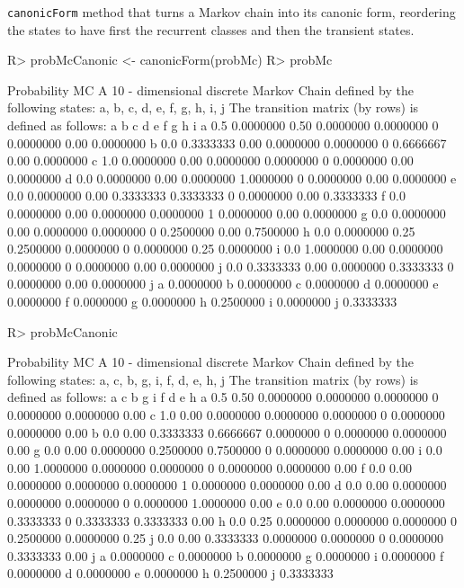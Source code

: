 \documentclass[
  nojss]{jss}
\begin{document}
\texttt{canonicForm} method that turns a Markov chain into its canonic form, reordering the states to have first the
recurrent classes and then the transient states.

\begin{CodeChunk}

\begin{CodeInput}
R> probMcCanonic <- canonicForm(probMc)
R> probMc
\end{CodeInput}

\begin{CodeOutput}
Probability MC 
 A  10 - dimensional discrete Markov Chain defined by the following states: 
 a, b, c, d, e, f, g, h, i, j 
 The transition matrix  (by rows)  is defined as follows: 
    a         b    c         d         e f         g    h         i
a 0.5 0.0000000 0.50 0.0000000 0.0000000 0 0.0000000 0.00 0.0000000
b 0.0 0.3333333 0.00 0.0000000 0.0000000 0 0.6666667 0.00 0.0000000
c 1.0 0.0000000 0.00 0.0000000 0.0000000 0 0.0000000 0.00 0.0000000
d 0.0 0.0000000 0.00 0.0000000 1.0000000 0 0.0000000 0.00 0.0000000
e 0.0 0.0000000 0.00 0.3333333 0.3333333 0 0.0000000 0.00 0.3333333
f 0.0 0.0000000 0.00 0.0000000 0.0000000 1 0.0000000 0.00 0.0000000
g 0.0 0.0000000 0.00 0.0000000 0.0000000 0 0.2500000 0.00 0.7500000
h 0.0 0.0000000 0.25 0.2500000 0.0000000 0 0.0000000 0.25 0.0000000
i 0.0 1.0000000 0.00 0.0000000 0.0000000 0 0.0000000 0.00 0.0000000
j 0.0 0.3333333 0.00 0.0000000 0.3333333 0 0.0000000 0.00 0.0000000
          j
a 0.0000000
b 0.0000000
c 0.0000000
d 0.0000000
e 0.0000000
f 0.0000000
g 0.0000000
h 0.2500000
i 0.0000000
j 0.3333333
\end{CodeOutput}

\begin{CodeInput}
R> probMcCanonic
\end{CodeInput}

\begin{CodeOutput}
Probability MC 
 A  10 - dimensional discrete Markov Chain defined by the following states: 
 a, c, b, g, i, f, d, e, h, j 
 The transition matrix  (by rows)  is defined as follows: 
    a    c         b         g         i f         d         e    h
a 0.5 0.50 0.0000000 0.0000000 0.0000000 0 0.0000000 0.0000000 0.00
c 1.0 0.00 0.0000000 0.0000000 0.0000000 0 0.0000000 0.0000000 0.00
b 0.0 0.00 0.3333333 0.6666667 0.0000000 0 0.0000000 0.0000000 0.00
g 0.0 0.00 0.0000000 0.2500000 0.7500000 0 0.0000000 0.0000000 0.00
i 0.0 0.00 1.0000000 0.0000000 0.0000000 0 0.0000000 0.0000000 0.00
f 0.0 0.00 0.0000000 0.0000000 0.0000000 1 0.0000000 0.0000000 0.00
d 0.0 0.00 0.0000000 0.0000000 0.0000000 0 0.0000000 1.0000000 0.00
e 0.0 0.00 0.0000000 0.0000000 0.3333333 0 0.3333333 0.3333333 0.00
h 0.0 0.25 0.0000000 0.0000000 0.0000000 0 0.2500000 0.0000000 0.25
j 0.0 0.00 0.3333333 0.0000000 0.0000000 0 0.0000000 0.3333333 0.00
          j
a 0.0000000
c 0.0000000
b 0.0000000
g 0.0000000
i 0.0000000
f 0.0000000
d 0.0000000
e 0.0000000
h 0.2500000
j 0.3333333
\end{CodeOutput}
\end{CodeChunk}
\end{document}
